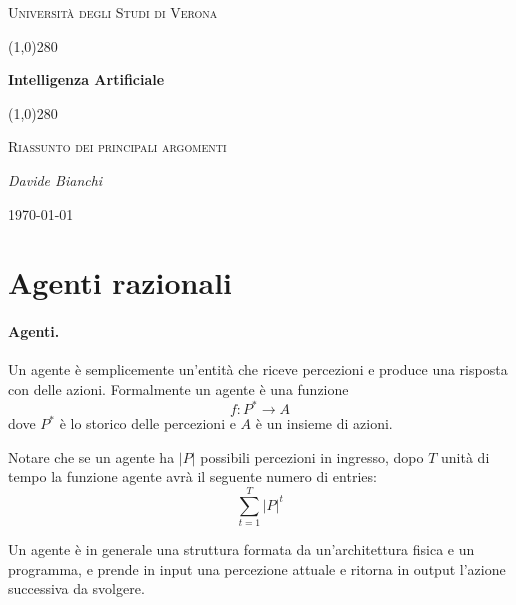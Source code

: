 \documentclass[a4paper, 11pt]{article}
\begin{document}
 \clearpage
 \begin{titlepage}
 	\centering
 	\vspace*{\fill}
 	{\scshape\LARGE Università degli Studi di Verona \par}
 	\vspace{1.5cm}
 	\line(1,0){280} \\
 	{\huge\bfseries Intelligenza Artificiale\par}
 	\line(1,0){280} \\
 	\vspace{0.5cm}
 	{\scshape\Large Riassunto dei principali argomenti\par}
 	\vspace{2cm}
 	{\Large\itshape Davide Bianchi\par}
 	\vspace{1cm}

 	\vspace{5cm}
 	\vspace*{\fill}
 	{\large \today\par}
 \end{titlepage}
 \thispagestyle{empty}
\newpage
\tableofcontents
\newpage


\section{Agenti razionali}
\paragraph{Agenti.}
Un agente è semplicemente un'entità che riceve percezioni e produce una risposta con delle azioni. Formalmente un agente è una funzione \[ f:P^\ast \to A \] dove $P^\ast$ è lo storico delle percezioni e $A$ è un insieme di azioni.

Notare che se un agente ha $\vert P \vert$ possibili percezioni in ingresso, dopo $T$ unità di tempo la funzione agente avrà il seguente numero di entries: \[ \sum_{t=1}^{T} \vert P \vert^t  \]

Un agente è in generale una struttura formata da un'architettura fisica e un programma, e prende in input una percezione attuale e ritorna in output l'azione successiva da svolgere. 
\end{document}
